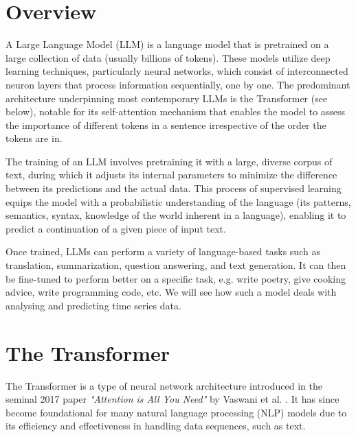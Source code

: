 \section{Overview}

A Large Language Model (LLM) \cite{llmintro} is a language model that is pretrained on a large collection of data (usually billions of tokens).
These models utilize deep learning techniques, particularly neural networks, which consist of interconnected neuron layers that process information sequentially, one by one.
The predominant architecture underpinning most contemporary LLMs is the Transformer (see below), notable for its self-attention mechanism that enables the model to assess the importance of different tokens in a sentence irrespective of the order the tokens are in.

The training of an LLM involves pretraining it with a large, diverse corpus of text, during which it adjusts its internal parameters to minimize the difference between its predictions and the actual data. This process of supervised learning equips the model with a probabilistic understanding of the language (its patterns, semantics, syntax, knowledge of the world inherent in a language), enabling it to predict a continuation of a given piece of input text.

Once trained, LLMs can perform a variety of language-based tasks such as translation, summarization, question answering, and text generation.
It can then be fine-tuned to perform better on a specific task, e.g. write poetry, give cooking advice, write programming code, etc.
We will see how such a model deals with analysing and predicting time series data.


\section{The Transformer}

The Transformer is a type of neural network architecture introduced in the seminal 2017 paper \textit{"Attention is All You Need"} by Vaswani et al. \cite{attention_is_all_you_need}. It has since become foundational for many natural language processing (NLP) models due to its efficiency and effectiveness in handling data sequences, such as text.

